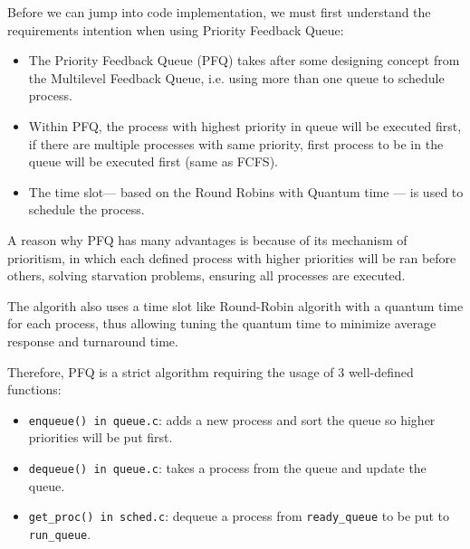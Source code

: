 \documentclass[a4paper]{article}
\numberwithin{equation}{section}
\begin{document}
Before we can jump into code implementation, we must first understand the requirements intention when using Priority Feedback Queue:

\begin{itemize}
    \item The Priority Feedback Queue (PFQ) takes after some designing concept from the Multilevel Feedback Queue, i.e. using more than one queue to schedule process. 
    \item Within PFQ, the process with highest priority in queue will be executed first, if there are multiple processes with same priority, first process to be in the queue will be executed first (same as FCFS).
    \item The time slot— based on the Round Robins with Quantum time — is used to schedule the process.
\end{itemize}

A reason why PFQ has many advantages is because of its mechanism of prioritism, in which each defined process with higher priorities will be ran before others, solving starvation problems, ensuring all processes are executed.

The algorith also uses a time slot like Round-Robin algorith with a quantum time for each process, thus allowing tuning the quantum time to minimize average response and turnaround time.

Therefore, PFQ is a strict algorithm requiring the usage of 3 well-defined functions:
\begin{itemize}
    \item \texttt{enqueue() in queue.c}: adds a new process and sort the queue so higher priorities will be put first.
    \item \texttt{dequeue() in queue.c}: takes a process from the queue and update the queue.
    \item \texttt{get_proc() in sched.c}: dequeue a process from \texttt{ready_queue} to be put to \texttt{run_queue}.
\end{itemize}
\newpage
\end{document}

